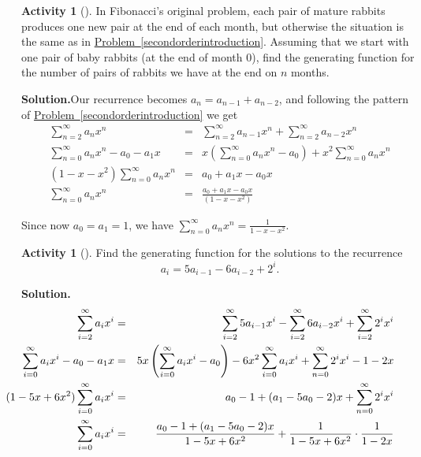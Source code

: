 \documentclass[10pt,]{book}
\theoremstyle{plain}
\theoremstyle{definition}
\newtheorem{activity}[project]{Activity}
\numberwithin{equation}{chapter}
\newcommand{\amp}{&}
\begin{document}
\begin{activity}[]\label{originalFibonacci}
In Fibonacci's original problem, each pair of mature rabbits produces one new pair at the end of each month, but otherwise the situation is the same as in \hyperref[secondorderintroduction]{Problem~\ref{secondorderintroduction}}.  Assuming that we start with one pair of baby rabbits (at the end of month 0), find the generating function for the number of pairs of rabbits we have at the end on \(n\) months.%
\par\medskip\noindent%
\textbf{Solution.}\quad Our recurrence becomes \(a_n=a_{n-1}+a_{n-2}\), and following the pattern of \hyperref[secondorderintroduction]{Problem~\ref{secondorderintroduction}} we get%
\begin{align*}
\sum_{n=2}^\infty a_nx^n\amp =\amp \sum_{n=2}^\infty a_{n-1}x^n +
\sum_{n=2}^\infty a_{n-2}x^n\\
\sum_{n=0}^\infty a_nx^n-a_0-a_1x \amp =\amp x\left(\sum_{n=0}^\infty
a_{n}x^{n}-a_0\right) + x^2\sum_{n=0}^\infty a_{n}x^n\\
(1-x-x^2)\sum_{n=0}^\infty a_nx^n\amp =\amp a_0+a_1x-a_0x\\
\sum_{n=0}^\infty a_nx^n\amp =\amp \frac{a_0+a_1x-a_0x}{(1-x-x^2)}
\end{align*}
%
\par
Since now \(a_0=a_1=1\), we have \(\displaystyle \sum_{n=0}^\infty a_nx^n=
\frac{1}{1-x-x^2}\).%
\end{activity}
\begin{activity}[]\label{secondordernonhomo}
Find the generating function for the solutions to the recurrence%
\begin{equation*}
a_i=5a_{i-1}-6a_{i-2} + 2^i.
\end{equation*}
%
\par\medskip\noindent%
\textbf{Solution.}\quad %
\begin{align*}
\sum_{i=2}^\infty a_ix^i \amp =\amp  \sum_{i=2}^\infty
5a_{i-1}x^i-\sum_{i=2}^\infty 6a_{i-2}x^i + \sum_{i=2}^\infty 2^ix^i\\
\hspace{-.3in}\sum_{i=0}^\infty a_ix^i -a_0-a_1x \amp =\amp 
5x\left(\sum_{i=0}^\infty
a_{i}x^i-a_0\right)-6x^2\sum_{i=0}^\infty a_{i}x^i + \sum_{n=0}^\infty
2^ix^i-1-2x\\
\hspace{-.55in}(1-5x+6x^2)\sum_{i=0}^\infty a_ix^i\amp =\amp a_0-1+(a_1-5a_0-2)x +
\sum_{n=0}^\infty 2^ix^i\\
\sum_{i=0}^\infty a_ix^i\amp =\amp  \frac{a_0-1+(a_1-5a_0-2)x}{1-5x+6x^2}+ \frac{1}{1-5x+6x^2}\cdot\frac{1}{1-2x}
\end{align*}
%
\end{activity}
\end{document}
